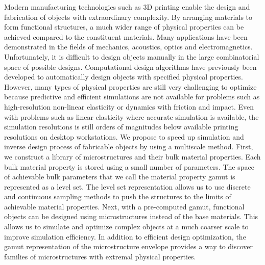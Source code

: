 % 
% 
%
Modern manufacturing technologies such as 3D printing enable the design and fabrication of objects with extraordinary complexity.
By arranging materials to form functional structures, a much wider range of physical properties can be achieved compared to the constituent materials.
Many applications have been demonstrated in the fields of mechanics, acoustics, optics and electromagnetics.
Unfortunately, it is difficult to design objects manually in the large combinatorial space of possible designs.
Computational design algorithms have previously been developed to automatically design objects with specified physical properties.
However, many types of physical properties are still very challenging to optimize because predictive and efficient simulations are not available for 
problems such as high-resolution non-linear elasticity or dynamics with friction and impact.
Even with problems such as linear elasticity where accurate simulation is available, the simulation resolutions is still orders of magnitudes below available printing resolutions
on desktop workstations.
We propose to speed up simulation and inverse design process of fabricable objects by using a multiscale method.
First, we construct a library of microstructures and their bulk material properties.
Each bulk material property is stored using a small number of parameters.
The space of achievable bulk parameters that we call the material property gamut is represented as a level set.
The level set representation allows us to use discrete and continuous sampling methods to push the structures to the limits of achievable material properties.
Next, with a pre-computed gamut, functional objects can be designed using microstructures instead of the base materials.
This allows us to simulate and optimize complex objects at a much coarser scale to improve simulation efficiency.
In addition to efficient design optimization, 
the gamut representation of the microstructure envelope provides a way to discover families of microstructures with extremal physical properties.